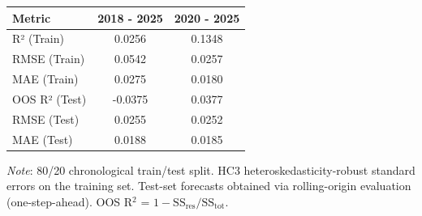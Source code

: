 \begin{tabular}{lcc}
  \toprule
  \textbf{Metric} & \textbf{2018 - 2025} & \textbf{2020 - 2025} \\ 
  \midrule
  R² (Train) & 0.0256 & 0.1348 \\ 
  RMSE (Train) & 0.0542 & 0.0257 \\ 
  MAE (Train) & 0.0275 & 0.0180 \\ 
  OOS R² (Test) & -0.0375 & 0.0377 \\ 
  RMSE (Test) & 0.0255 & 0.0252 \\ 
  MAE (Test) & 0.0188 & 0.0185 \\ 
  \bottomrule
\end{tabular}
\par\vspace{4pt}
\begin{minipage}{\linewidth}
  \footnotesize \textit{Note}: 80/20 chronological train/test split. HC3 heteroskedasticity-robust standard errors on the training set. Test-set forecasts obtained via rolling-origin evaluation (one-step-ahead). OOS R$^2$ = $1 - \text{SS}_{\text{res}} / \text{SS}_{\text{tot}}$.
\end{minipage}